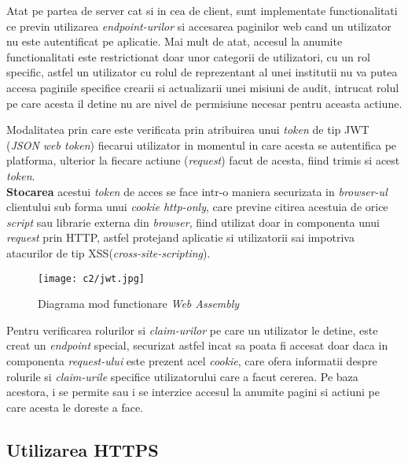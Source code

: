 Atat pe partea de server cat si in cea de client, sunt implementate functionalitati ce previn utilizarea \textit{endpoint-urilor} si accesarea paginilor web cand un utilizator nu este autentificat pe aplicatie. Mai mult de atat, accesul la anumite functionalitati este restrictionat doar unor categorii de utilizatori, cu un rol specific, astfel un utilizator cu rolul de reprezentant al unei institutii nu va putea accesa paginile specifice crearii si actualizarii unei misiuni de audit, intrucat rolul pe care acesta il detine nu are nivel de permisiune necesar pentru aceasta actiune.

Modalitatea prin care este verificata prin atribuirea unui \textit{token} de tip JWT (\textit{JSON web token}) fiecarui utilizator in momentul in care acesta se autentifica pe platforma, ulterior la fiecare actiune (\textit{request}) facut de acesta, fiind trimis si acest \textit{token}.\\



\textbf{Stocarea} acestui \textit{token} de acces se face intr-o maniera securizata in \textit{browser-ul} clientului sub forma unui \textit{cookie http-only}, care previne citirea acestuia de orice \textit{script} sau librarie externa din \textit{browser}, fiind utilizat doar in componenta unui \textit{request} prin HTTP, astfel protejand aplicatie si utilizatorii sai impotriva atacurilor de tip XSS(\textit{cross-site-scripting}).

\vspace{1cm}
\begin{figure}[h]
	\centering
	
	\texttt{[image: c2/jwt.jpg]}
	\caption{Diagrama mod functionare \textit{Web Assembly}}
\end{figure}

Pentru verificarea rolurilor si \textit{claim-urilor} pe care un utilizator le detine, este creat un \textit{endpoint} special, securizat astfel incat sa poata fi accesat doar daca in componenta \textit{request-ului} este prezent acel \textit{cookie}, care ofera informatii despre rolurile si \textit{claim-urile} specifice utilizatorului care a facut cererea. Pe baza acestora, i se permite sau i se interzice accesul la anumite pagini si actiuni pe care acesta le doreste a face.


\subsection*{Utilizarea HTTPS}

